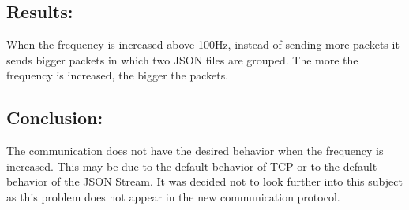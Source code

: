 \subsection*{Results:}

When the frequency is increased above 100Hz, instead of sending more packets it sends bigger packets in which two \gls{JSON} files are grouped. The more the frequency is increased, the bigger the packets.

\subsection*{Conclusion:}

The communication does not have the desired behavior when the frequency is increased. This may be due to the default behavior of TCP or to the default behavior of the JSON Stream. It was decided not to look further into this subject as this problem does not appear in the new communication protocol.